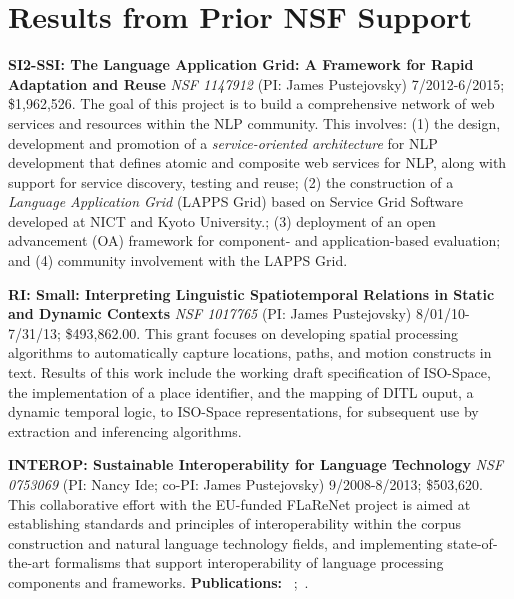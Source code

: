 \documentclass[10pt]{article}
\newcommand{\miniskip}{\vspace*{1mm}}
\begin{document}
\vspace {-5mm}
\section{Results from Prior NSF Support}

\vspace {-3mm}

\noindent
 {\bf SI2-SSI: The Language Application Grid: A Framework for Rapid Adaptation and Reuse} 
{\it NSF 1147912} (PI: James Pustejovsky) 7/2012-6/2015; \$1,962,526.
The goal of this  project is to  build  a comprehensive network of web services and resources within the NLP community. This involves:
(1) the design, development  and promotion of a {\it service-oriented architecture} for NLP development that defines atomic and composite web services for NLP, along with support for service discovery, testing and reuse; (2)  the construction of a {\it Language Application Grid} (LAPPS Grid) based on Service Grid Software developed at NICT and Kyoto University.; (3)  deployment of an open advancement (OA) framework for
component- and application-based evaluation; and  (4)   community involvement with the LAPPS Grid.  

\noindent
 {\bf 
RI: Small: Interpreting Linguistic Spatiotemporal Relations in Static and Dynamic Contexts}
{\it NSF 1017765} (PI: James Pustejovsky)  8/01/10-7/31/13; 
\$493,862.00. This grant focuses on developing spatial processing algorithms  to automatically capture locations, paths, and motion constructs in text.  Results of this work include the working draft specification of ISO-Space, the implementation of a place identifier, and the mapping of DITL ouput, a dynamic temporal logic, to ISO-Space representations, for subsequent use by extraction and inferencing algorithms. 

\noindent
{\bf INTEROP: Sustainable Interoperability for Language Technology} 
{\it NSF 0753069} (PI: Nancy Ide; co-PI: James Pustejovsky) 9/2008-8/2013; \$503,620.
This collaborative effort with the EU-funded FLaReNet project is aimed at establishing standards and principles of interoperability within the corpus construction and natural language technology fields, and implementing state-of-the-art formalisms that support interoperability of language processing components and frameworks.  {\bf Publications: }~\cite{idesuderman09};~\cite{ide-bunt:2010:LAW-IV}.
%
\end{document}
